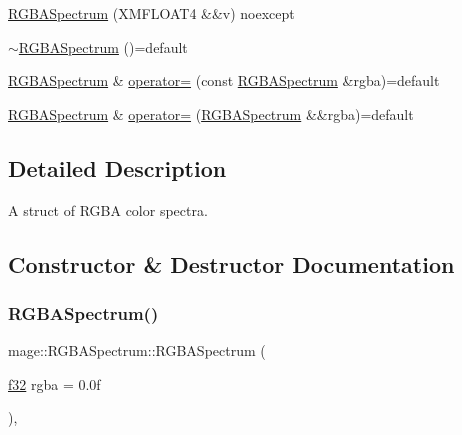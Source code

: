 \begin{DoxyCompactItemize}
\item 
\hyperlink{structmage_1_1_r_g_b_a_spectrum_a623c661a4c99fddc271e994ea4fd3c2f}{R\+G\+B\+A\+Spectrum} (X\+M\+F\+L\+O\+A\+T4 \&\&v) noexcept
\item 
\hyperlink{structmage_1_1_r_g_b_a_spectrum_a0b30d3cdb54965f4e9524904ed5fbf85}{$\sim$\+R\+G\+B\+A\+Spectrum} ()=default
\item 
\hyperlink{structmage_1_1_r_g_b_a_spectrum}{R\+G\+B\+A\+Spectrum} \& \hyperlink{structmage_1_1_r_g_b_a_spectrum_a1b9910f5ce9cb368b88e1b02fb4c4c72}{operator=} (const \hyperlink{structmage_1_1_r_g_b_a_spectrum}{R\+G\+B\+A\+Spectrum} \&rgba)=default
\item 
\hyperlink{structmage_1_1_r_g_b_a_spectrum}{R\+G\+B\+A\+Spectrum} \& \hyperlink{structmage_1_1_r_g_b_a_spectrum_ae23c094db4110804cf4b3bc0a00af131}{operator=} (\hyperlink{structmage_1_1_r_g_b_a_spectrum}{R\+G\+B\+A\+Spectrum} \&\&rgba)=default
\end{DoxyCompactItemize}


\subsection{Detailed Description}
A struct of R\+G\+BA color spectra. 

\subsection{Constructor \& Destructor Documentation}
\hypertarget{structmage_1_1_r_g_b_a_spectrum_ac40872d8e9de6848ab85353640ed4c6a}{}\label{structmage_1_1_r_g_b_a_spectrum_ac40872d8e9de6848ab85353640ed4c6a} 
\subsubsection{\texorpdfstring{R\+G\+B\+A\+Spectrum()}{RGBASpectrum()}\hspace{0.1cm}{\footnotesize\ttfamily [1/10]}}
{\footnotesize\ttfamily mage\+::\+R\+G\+B\+A\+Spectrum\+::\+R\+G\+B\+A\+Spectrum (\begin{DoxyParamCaption}\item[{\hyperlink{namespacemage_a6a44ad388483959dc4dff9f2aef91431}{f32}}]{rgba = {\ttfamily 0.0f} }\end{DoxyParamCaption})\hspace{0.3cm}{\ttfamily [explicit]}, {\ttfamily [noexcept]}}

